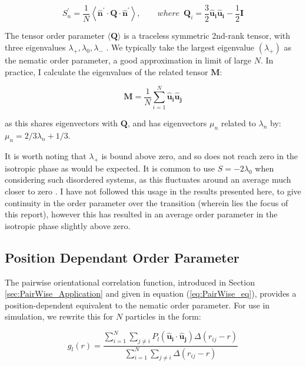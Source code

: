 \documentclass[11pt, a4paper]{article} %
\begin{document}
\begin{appendices}
\begin{equation}
S^{\prime}_{n} = \frac{1}{N} \left\langle \boldsymbol{\hat{n}^{\prime}} \cdot \textbf{Q} \cdot \boldsymbol{\hat{n}^{\prime}}  \right\rangle, \qquad where \enspace \textbf{Q}_{i} = \frac{3}{2} \boldsymbol{\hat{u}_{i}}\boldsymbol{\hat{u}_{i}}-\frac{1}{2}\textbf{I}
\end{equation}

The tensor order parameter $\langle \textbf{Q} \rangle$ is a traceless symmetric 2nd-rank tensor, with three eigenvalues $\lambda_{+}, \lambda_{0}, \lambda_{-}$ \cite{Eppenga1984}. We typically take the largest eigenvalue $(\lambda_{+})$ as the nematic order parameter, a good approximation in limit of large $N$.
In practice, I calculate the eigenvalues of the related tensor $\textbf{M}$:

\begin{equation}
\textbf{M} =  \frac{1}{N} \sum_{i=1}^{N} \boldsymbol{\hat{u}_{i}}\boldsymbol{\hat{u}_{j}}
\end{equation}

as this shares eigenvectors with $\textbf{Q}$, and has eigenvectors $\mu_{n}$ related to $\lambda_{n}$ by: $\mu_{n} = 2/3 \lambda_{n} + 1/3$.

It is worth noting that $\lambda_{+}$ is bound above zero, and so does not reach zero in the isotropic phase as would be expected. It is common to use $S =  -2\lambda_{0}$ when considering such disordered systems, as this fluctuates around an average much closer to zero \cite{Mountain1977}. I have not followed this usage in the results presented here, to give continuity in the order parameter over the transition (wherein lies the focus of this report), however this has resulted in an average order parameter in the isotropic phase slightly above zero.

\subsection{Position Dependant Order Parameter} \label{sec:PairWise_Theory}
The pairwise orientational correlation function, introduced in Section \ref{sec:PairWise_Application} and given in equation (\ref{eq:PairWise_eq}), provides a position-dependent equivalent to the nematic order parameter. For use in simulation, we rewrite this for $N$ particles in the form:

\begin{equation}
g_{l}(r) = \frac{\sum_{i=1}^{N} \sum_{j \neq i} P_{l}(\boldsymbol{\hat{u}_{i}}\cdot \boldsymbol{\hat{u}_{j}}) \Delta(r_{ij}-r)}{\sum_{i=1}^{N} \sum_{j \neq i} \Delta(r_{ij}-r)}
\end{equation}


\end{appendices}
\end{document}
